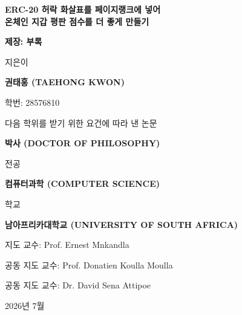 \ifcase\ChapterOnly\relax
\or
  \def\ChapterCoverTitle{서론과 연구 문제}%
\or
  \def\ChapterCoverTitle{앞선 연구 살펴보기와 이론의 틀}%
\or
  \def\ChapterCoverTitle{연구 방법}%
\or
  \def\ChapterCoverTitle{구현과 실증 결과}%
\or
  \def\ChapterCoverTitle{논의}%
\or
  \def\ChapterCoverTitle{결론과 앞으로 할 일}%
\or
  \def\ChapterCoverTitle{참고문헌}%
\or
  \def\ChapterCoverTitle{부록}%
\fi

\begin{titlepage}
\centering
\vspace*{0.4cm}
{\Large\bfseries ERC-20 허락 화살표를 페이지랭크에 넣어\\온체인 지갑 평판 점수를 더 좋게 만들기\par}
\vspace{1.2cm}
{\large\bfseries 제\ChapterOnly 장: \ChapterCoverTitle\par}
\vfill
{지은이\par}
\vspace{0.7cm}
{\large\bfseries 권태홍 (TAEHONG KWON)\par}
\vspace{0.35cm}
{학번: 28576810\par}
\vfill
{다음 학위를 받기 위한 요건에 따라 낸 논문\par}
\vspace{0.7cm}
{\large\bfseries 박사 (DOCTOR OF PHILOSOPHY)\par}
\vspace{0.35cm}
{전공\par}
\vspace{0.7cm}
{\large\bfseries 컴퓨터과학 (COMPUTER SCIENCE)\par}
\vfill
{학교\par}
\vspace{0.7cm}
{\large\bfseries 남아프리카대학교 (UNIVERSITY OF SOUTH AFRICA)\par}
\vfill
{지도 교수: Prof. Ernest Mnkandla\par}
\vspace{0.35cm}
{공동 지도 교수: Prof. Donatien Koulla Moulla\par}
\vspace{0.35cm}
{공동 지도 교수: Dr. David Sena Attipoe\par}
\vfill
{2026년 7월\par}
\end{titlepage}
\restoregeometry
\ifdefined\ChapterStartPage
  \setcounter{page}{\ChapterStartPage}%
\fi

